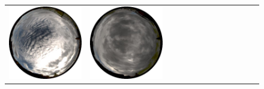 \documentclass{report}
\begin{document}
\begin{figure}[!th]
\begin{tabular}{@{}rcccccccccccc@{}}
    \includegraphics[width=\customwidth]{./figures/database/20131106_145915.jpg} &
    \includegraphics[width=\customwidth]{./figures/database/20131106_152913.jpg} &

\end{tabular}
\end{figure}
\end{document}
